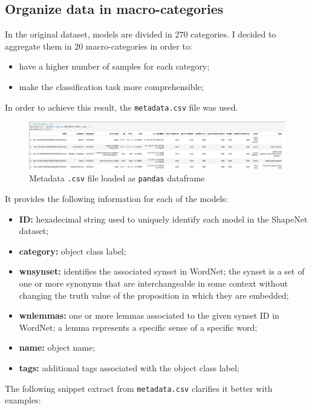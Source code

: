 \documentclass[11pt,a4paper]{article}
\begin{document}
\subsection{Organize data in macro-categories}
In the original dataset, models are divided in $270$ categories. I decided to aggregate them in $20$ macro-categories in order to:
\begin{itemize}
    \item have a higher number of samples for each category;
    \item make the classification task more comprehensible;
\end{itemize}
In order to achieve this result, the \texttt{metadata.csv} file was used.
\begin{figure}[H]
    \centering
    \includegraphics[scale=0.24]{imgs/metadata-pandas-df.png}
    \caption{Metadata \texttt{.csv} file loaded as \texttt{pandas} dataframe}
\end{figure}
\noindent
It provides the following information for each of the models:
\begin{itemize}
    \item \textbf{ID:} hexadecimal string used to uniquely identify each model in the ShapeNet dataset;
    \item \textbf{category:} object class label;
    \item \textbf{wnsynset:} identifies the associated synset in WordNet; the synset is a set of one or more synonyms that are interchangeable in some context without changing the truth value of the proposition in which they are embedded;
    \item \textbf{wnlemmas:} one or more lemmas associated to the given synset ID in WordNet; a lemma represents a specific sense of a specific word;
    \item \textbf{name:} object name;
    \item \textbf{tags:} additional tags associated with the object class label;
\end{itemize}
The following snippet extract from \texttt{metadata.csv} clarifies it better with examples:\\
\\
\setlength\extrarowheight{5pt}
\end{document}
